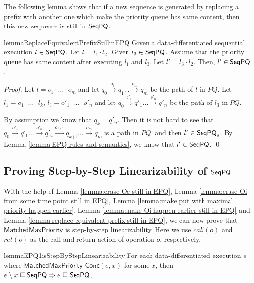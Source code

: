 The following lemma shows that if a new sequence is generated by replacing a prefix with another one which make the priority queue has same content, then this new sequence is still in $\mathsf{SeqPQ}$.

\begin{restatable}{lemma}{ReplaceEquivalentPrefixStillinEPQ}
\label{lemma:replace equivalent prefix still in EPQ}
Given a data-differentiated sequential execution $l \in \mathsf{SeqPQ}$. Let $l=l_1 \cdot l_2$. Given $l_3 \in \mathsf{SeqPQ}$. Assume that the priority queue has same content after executing $l_1$ and $l_3$. Let $l' = l_3 \cdot l_2$. Then, $l' \in \mathsf{SeqPQ}$.
\end{restatable}

\begin {proof}
Let $l=o_1 \cdot \ldots \cdot o_m$ and let $q_0 \xrightarrow{o_1} q_1 \ldots \xrightarrow{o_m} q_m$ be the path of $l$ in $\textit{PQ}$. Let $l_1 = o_1 \cdot \ldots \cdot l_k$, $l_3 = o'_1 \cdot \ldots \cdot o'_n$ and let $q_0 \xrightarrow{o'_1} q'_1 \ldots \xrightarrow{o'_n} q'_n$ be the path of $l_3$ in $\textit{PQ}$.

By assumption we know that $q_k = q'_n$. Then it is not hard to see that $q_0 \xrightarrow{o'_1} q'_1 \ldots \xrightarrow{o'_n} q'_n \xrightarrow{o_{\textit{k+1}}} q_{\textit{k+1}} \ldots \xrightarrow{o_m} q_m$ is a path in $\textit{PQ}$, and then $l' \in \mathsf{SeqPQ}_s$. By Lemma \ref{lemma:EPQ rules and semantics}, we know that $l' \in \mathsf{SeqPQ}$. \qed
\end {proof}




\subsection{Proving Step-by-Step Linearizability of $\mathsf{SeqPQ}$}
\label{sec:obtaining new sequences while ensureing that they are in SeqPQ}


With the help of Lemma \ref{lemma:erase Oc still in EPQ}, Lemma \ref{lemma:erase Oi from some time point still in EPQ}, Lemma \ref{lemma:make put with maximal priority happen earlier}, Lemma \ref{lemma:make Oi happen earlier still in EPQ} and Lemma \ref{lemma:replace equivalent prefix still in EPQ}, we can now prove that $\mathsf{MatchedMaxPriority}$ is step-by-step linearizability. Here we use $\textit{call}(o)$ and $\textit{ret}(o)$ as the call and return action of operation $o$, respectively.

\begin{restatable}{lemma}{EPQ1isStepByStepLinearizability}
\label{lemma:EPQ1 is step-by-step linearizability}
For each data-differentiated execution $e$ where $\mathsf{MatchedMaxPriority}\mathsf{\text{-}Conc}(e,x)$ for some $x$, then $e \setminus x \sqsubseteq \mathsf{SeqPQ} \Rightarrow e \sqsubseteq \mathsf{SeqPQ}$.
\end{restatable}

